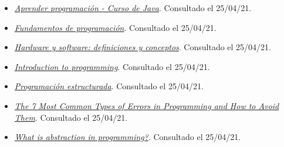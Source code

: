 \documentclass[
]{book}
\providecommand{\tightlist}{%
  \setlength{\itemsep}{0pt}\setlength{\parskip}{0pt}}
\begin{document}
\begin{itemize}
\tightlist
\item
  \href{https://www.aprenderprogramacion.com.ar/2020/03/1-breve-historia-de-la-programacion.html}{\emph{Aprender programación - Curso de Java}}. Consultado el 25/04/21.
\item
  \href{http://www.utn.edu.ec/reduca/programacion/fundamentos/fundamentos_de_programacin.html}{\emph{Fundamentos de programación}}. Consultado el 25/04/21.
\item
  \href{https://www.profesionalreview.com/2019/11/10/hardware-software-definiciones/}{\emph{Hardware y software: definiciones y conceptos}}. Consultado el 25/04/21.
\item
  \href{https://www.bbc.co.uk/bitesize/guides/zts8d2p/revision/1}{\emph{Introduction to programming}}. Consultado el 25/04/21.
\item
  \href{http://www1.frm.utn.edu.ar/informatica1/VIANI/PROGRAMACION\%20ESTRUCTURADA/PROGRAMACION\%20ESTRUCTURADA.PDF}{\emph{Programación estructurada}}. Consultado el 25/04/21.
\item
  \href{https://textexpander.com/blog/the-7-most-common-types-of-errors-in-programming-and-how-to-avoid-them}{\emph{The 7 Most Common Types of Errors in Programming and How to Avoid Them}}. Consultado el 25/04/21.
\item
  \href{https://levelup.gitconnected.com/what-is-abstraction-in-programming-2f35c8c72e15}{\emph{What is abstraction in programming?}}. Consultado el 25/04/21.
\end{itemize}
\end{document}
